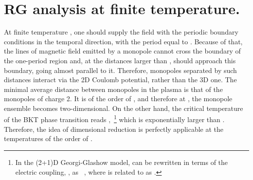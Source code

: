 \documentclass[a4paper,12pt]{article}
\begin{document}
\section{RG analysis at finite temperature.}
At finite temperature \coordHE{}, one should supply the field \myHighlight{$\chi$}\coordHE{}
with the periodic boundary conditions in the temporal direction, with the period equal to
\myHighlight{$\beta$}\coordHE{}. Because of that, the lines of magnetic field emitted by a monopole cannot cross
the boundary of the one-period region and, at the distances larger than \myHighlight{$\beta$}\coordHE{},
should approach this boundary, going almost parallel to it.
Therefore, monopoles separated by such distances
interact via the 2D Coulomb potential, rather than the 3D one. The minimal average distance
between monopoles in the plasma is that of the monopoles of charge 2. It is of the order of \coordHE{},
and therefore at \coordHE{},
the monopole ensemble becomes two-dimensional. On the other hand, the critical temperature of the BKT phase transition
reads \coordHE{},~\footnote{In the (2+1)D Georgi-Glashow model, \coordHE{} can be rewritten in terms of the
electric coupling, \coordHE{}, as \coordHE{}~\cite{nk}, where \coordHE{} is related to \coordHE{} as \coordHE{}.}
which is exponentially larger than \coordHE{}.
Therefore, the idea of dimensional reduction is perfectly applicable
at the temperatures of the order of \coordHE{}.
\end{document}
